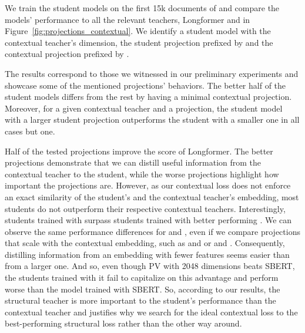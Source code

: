 We train the student models on the first 15k documents of 
and compare the models' performance to all the relevant teachers, Longformer
and  in Figure~\ref{fig:projections_contextual}.
We identify a student model with the contextual teacher's dimension, the
student projection prefixed by  and the contextual projection
prefixed by .

The results correspond to those we witnessed in our preliminary experiments and
showcase some of the mentioned projections' behaviors. The better half of the
student models differs from the rest by having a minimal contextual projection.
Moreover, for a given contextual teacher and a projection, the student model
with a larger student projection outperforms the student with a smaller one in
all cases but one.

Half of the tested projections improve the score of Longformer. The better
projections demonstrate that we can distill useful information from the
contextual teacher to the student, while the worse projections highlight how
important the projections are. However, as our contextual loss does not enforce
an exact similarity of the student's and the contextual teacher's embedding,
most students do not outperform their respective contextual teachers.
Interestingly, students trained with  surpass students trained
with better performing . We can observe the same performance
differences for  and , even if we compare
projections that scale with the contextual embedding, such as
 and  or
 and . Consequently,
distilling information from an embedding with fewer features seems easier than
from a larger one. And so, even though PV with 2048 dimensions beats SBERT, the
students trained with it fail to capitalize on this advantage and perform worse than the model trained with SBERT. So, according to our results, the structural teacher is more important to the student's performance
than the contextual teacher and justifies why we search for the ideal
contextual loss to the best-performing structural loss rather than the other
way around.

